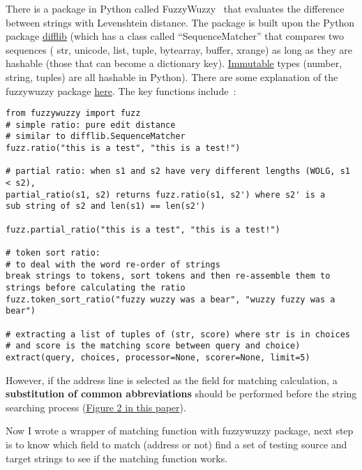 \documentclass[12pt]{article}
\begin{document}
There is a package in Python called FuzzyWuzzy~\cite{fuzzyWuzzy2015}
that evaluates the difference between strings with Levenshtein
distance. The package is built upon the Python package
\href{https://docs.python.org/2/library/difflib.html}{difflib} (which
has a class called ``SequenceMatcher'' that compares two sequences (
str, unicode, list, tuple, bytearray, buffer, xrange) as long as they
are hashable (those that can become a dictionary
key). \href{https://docs.python.org/2/glossary.html#term-immutable}{Immutable}
types (number, string, tuples) are all hashable in Python). There are
some explanation of the fuzzywuzzy package
\href{http://chairnerd.seatgeek.com/fuzzywuzzy-fuzzy-string-matching-in-python/}{here}. The
key functions include~\cite{fuzzyWuzzyGit2015}:
\makeatletter
\def\verbatim@font{\linespread{1}\small\ttfamily}
\makeatother
\begin{verbatim}
from fuzzywuzzy import fuzz
# simple ratio: pure edit distance
# similar to difflib.SequenceMatcher
fuzz.ratio("this is a test", "this is a test!")

# partial ratio: when s1 and s2 have very different lengths (WOLG, s1
< s2),
partial_ratio(s1, s2) returns fuzz.ratio(s1, s2') where s2' is a
sub string of s2 and len(s1) == len(s2')

fuzz.partial_ratio("this is a test", "this is a test!")

# token sort ratio: 
# to deal with the word re-order of strings
break strings to tokens, sort tokens and then re-assemble them to strings before calculating the ratio
fuzz.token_sort_ratio("fuzzy wuzzy was a bear", "wuzzy fuzzy was a bear")

# extracting a list of tuples of (str, score) where str is in choices 
# and score is the matching score between query and choice)
extract(query, choices, processor=None, scorer=None, limit=5)
\end{verbatim}

However, if the address line is selected as the field for matching
calculation, a \textbf{substitution of common abbreviations} should be
performed before the string searching process
(\href{http://citeseerx.ist.psu.edu/viewdoc/download?doi=10.1.1.119.714&rep=rep1&type=pdf}{Figure
  2 in this paper}).

Now I wrote a wrapper of matching function with fuzzywuzzy package,
next step is to know which field to match (address or not) find a set
of testing source and target strings to see if the matching function
works.

\newpage


\end{document}

